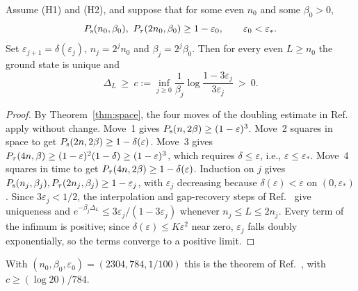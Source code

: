 \documentclass[aps,prl,reprint,amsmath,amssymb,nofootinbib,raggedbottom]{revtex4-2}
\begin{document}
\begin{theorem}\label{thm:criterion}
Assume (H1) and (H2), and suppose that for some even $n_0$ and some $\beta_0>0$,
\begin{equation}
 \Ps(n_0,\beta_0),\ \Pt(2n_0,\beta_0)\ge1-\varepsilon_0,\qquad
 \varepsilon_0<\varepsilon_* .
 \label{eq:H3}
\end{equation}
Set $\varepsilon_{j+1}=\delta(\varepsilon_j)$, $n_j=2^jn_0$ and
$\beta_j=2^j\beta_0$. Then for every even $L\ge n_0$ the ground state
is unique and
\begin{equation}
 \Delta_L\ \ge\ c:=\inf_{j\ge0}\frac1{\beta_j}
 \log\frac{1-3\varepsilon_j}{3\varepsilon_j}\ >\ 0 .
 \label{eq:c}
\end{equation}
\end{theorem}
\begin{proof}
By Theorem~\ref{thm:space}, the four moves of the doubling estimate in
Ref.~\cite{main} apply without change. Move~1 gives
$P_{\mathrm s}(n,2\beta)\ge(1-\varepsilon)^3$. Move~2 squares in space to get
$P_{\mathrm s}(2n,2\beta)\ge1-\delta(\varepsilon)$. Move~3 gives
$P_{\tau}(4n,\beta)\ge(1-\varepsilon)^2(1-\delta)\ge(1-\varepsilon)^3$, which
requires $\delta\le\varepsilon$, i.e., $\varepsilon\le\varepsilon_*$.
Move~4 squares in time to get $P_{\tau}(4n,2\beta)\ge1-\delta(\varepsilon)$.
Induction on $j$ gives
$P_{\mathrm s}(n_j,\beta_j),P_{\tau}(2n_j,\beta_j)\ge1-\varepsilon_j$, with
$\varepsilon_j$ decreasing because $\delta(\varepsilon)<\varepsilon$ on
$(0,\varepsilon_*)$.
Since $3\varepsilon_j<1/2$, the interpolation and gap-recovery steps of
Ref.~\cite{main} give uniqueness and $e^{-\beta_j\Delta_L}\le
3\varepsilon_j/(1-3\varepsilon_j)$ whenever $n_j\le L\le2n_j$.
Every term of the infimum is positive; since
$\delta(\varepsilon)\le K\varepsilon^2$ near zero, $\varepsilon_j$ falls
doubly exponentially, so the terms converge to a positive limit.
\end{proof}
With $(n_0,\beta_0,\varepsilon_0)=(2304,784,1/100)$ this is the theorem of
Ref.~\cite{main}, with $c\ge(\log20)/784$.
\end{document}
